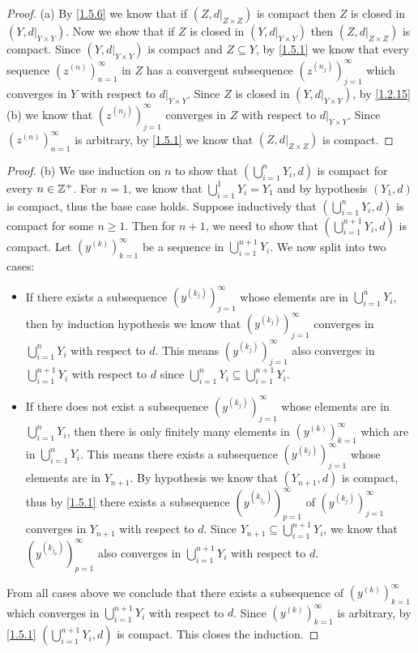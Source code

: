\begin{proof}{(a)}
  By \cref{1.5.6} we know that if \((Z, d|_{Z \times Z})\) is compact then \(Z\) is closed in \((Y, d|_{Y \times Y})\).
  Now we show that if \(Z\) is closed in \((Y, d|_{Y \times Y})\) then \((Z, d|_{Z \times Z})\) is compact.
  Since \((Y, d|_{Y \times Y})\) is compact and \(Z \subseteq Y\), by \cref{1.5.1} we know that every sequence \((z^{(n)})_{n = 1}^\infty\) in \(Z\) has a convergent subsequence \((z^{(n_j)})_{j = 1}^\infty\) which converges in \(Y\) with respect to \(d|_{Y \times Y}\).
  Since \(Z\) is closed in \((Y, d|_{Y \times Y})\), by \cref{1.2.15}(b) we know that \((z^{(n_j)})_{j = 1}^\infty\) converges in \(Z\) with respect to \(d|_{Y \times Y}\).
  Since \((z^{(n)})_{n = 1}^\infty\) is arbitrary, by \cref{1.5.1} we know that \((Z, d|_{Z \times Z})\) is compact.
\end{proof}

\begin{proof}{(b)}
  We use induction on \(n\) to show that \((\bigcup_{i = 1}^n Y_i, d)\) is compact for every \(n \in \mathbb{Z}^+\).
  For \(n = 1\), we know that \(\bigcup_{i = 1}^1 Y_i = Y_1\) and by hypothesis \((Y_1, d)\) is compact, thus the base case holds.
  Suppose inductively that \((\bigcup_{i = 1}^n Y_i, d)\) is compact for some \(n \geq 1\).
  Then for \(n + 1\), we need to show that \((\bigcup_{i = 1}^{n + 1} Y_i, d)\) is compact.
  Let \((y^{(k)})_{k = 1}^\infty\) be a sequence in \(\bigcup_{i = 1}^{n + 1} Y_i\).
  We now split into two cases:
  \begin{itemize}
    \item If there exists a subsequence \((y^{(k_j)})_{j = 1}^\infty\) whose elements are in \(\bigcup_{i = 1}^n Y_i\), then by induction hypothesis we know that \((y^{(k_j)})_{j = 1}^\infty\) converges in \(\bigcup_{i = 1}^n Y_i\) with respect to \(d\).
          This means \((y^{(k_j)})_{j = 1}^\infty\) also converges in \(\bigcup_{i = 1}^{n + 1} Y_i\) with respect to \(d\) since \(\bigcup_{i = 1}^n Y_i \subseteq \bigcup_{i = 1}^{n + 1} Y_i\).
    \item If there does not exist a subsequence \((y^{(k_j)})_{j = 1}^\infty\) whose elements are in \(\bigcup_{i = 1}^n Y_i\), then there is only finitely many elements in \((y^{(k)})_{k = 1}^\infty\) which are in \(\bigcup_{i = 1}^n Y_i\).
          This means there exists a subsequence \((y^{(k_j)})_{j = 1}^\infty\) whose elements are in \(Y_{n + 1}\).
          By hypothesis we know that \((Y_{n + 1}, d)\) is compact, thus by \cref{1.5.1} there exists a subsequence \((y^{(k_{j_p})})_{p = 1}^\infty\) of \((y^{(k_j)})_{j = 1}^\infty\) converges in \(Y_{n + 1}\) with respect to \(d\).
          Since \(Y_{n + 1} \subseteq \bigcup_{i = 1}^{n + 1} Y_i\), we know that \((y^{(k_{j_p})})_{p = 1}^\infty\) also converges in \(\bigcup_{i = 1}^{n + 1} Y_i\) with respect to \(d\).
  \end{itemize}
  From all cases above we conclude that there exists a subsequence of \((y^{(k)})_{k = 1}^\infty\) which converges in \(\bigcup_{i = 1}^{n + 1} Y_i\) with respect to \(d\).
  Since \((y^{(k)})_{k = 1}^\infty\) is arbitrary, by \cref{1.5.1} \((\bigcup_{i = 1}^{n + 1} Y_i, d)\) is compact.
  This closes the induction.
\end{proof}

